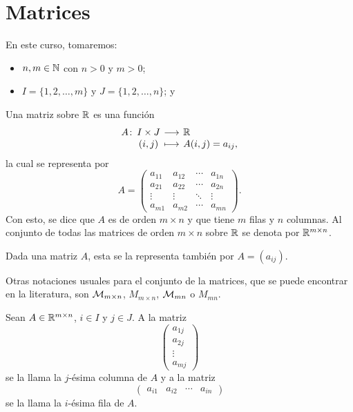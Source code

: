 \documentclass[a4,11pt]{aleph-notas}
\begin{document}
\encabezado

\section{Matrices}

En este curso, tomaremos:
\begin{itemize}
    \item
        $n,m\in \N$ con $n>0$ y $m>0$;
    \item 
        $I = \{ 1, 2, \ldots, m\}$ y $J =  \{1, 2 , \ldots, n \}$; y
\end{itemize}

\begin{defi}[Matriz]
    Una matriz sobre $\R$ es una función 
    \[
        \funcion{A}{I\times J}{\R}
        {(i,j)}{A(i,j)=a_{ij},}
    \]
    la cual se representa por
    \[
        A = 
        \begin{pmatrix}
        a_{11} & a_{12} & \cdots & a_{1n} \\ 
        a_{21} & a_{22} & \cdots & a_{2n} \\ 
        \vdots & \vdots & \ddots & \vdots\\ 
        a_{m1} & a_{m2} & \cdots & a_{mn}
        \end{pmatrix}.
    \]
    Con esto, se dice que $A$ es de orden $m \times n$ y que tiene $m$ filas y $n$ columnas. Al conjunto de todas las matrices de orden $m \times n$ sobre $\R$ se denota por $\Mat[\R]{m}{n}$.
\end{defi}

\begin{advertencia}
    Dada una matriz $A$, esta se la representa también por $A=(a_{ij})$.
\end{advertencia}

\begin{advertencia}
    Otras notaciones usuales para el conjunto de la matrices, que se puede encontrar en la literatura, son $\M_{m\times n}$, $M_{m\times n}$, $\M_{mn}$ o $M_{mn}$.
\end{advertencia}

\begin{defi}
    Sean $A\in\Mat[\R]{m}{n}$, $i\in I$ y $j\in J$. A la matriz
    \[
        \begin{pmatrix}
        a_{1j} \\ 
        a_{2j} \\ 
        \vdots \\ 
        a_{mj} 
        \end{pmatrix}
    \]
    se la llama la $j$-ésima columna de $A$ y a la matriz
    \[
        \begin{pmatrix}
        a_{i1}& a_{i2}&\cdots& a_{in}
        \end{pmatrix}
    \]
    se la llama la $i$-ésima fila de $A$.
\end{defi}
\end{document}
